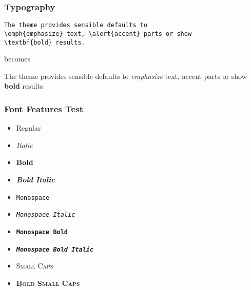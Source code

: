 \documentclass[10pt]{beamer}
\begin{document}
\begin{frame}[fragile]
\frametitle{Typography}
  \begin{verbatim}The theme provides sensible defaults to
\emph{emphasize} text, \alert{accent} parts or show
\textbf{bold} results.\end{verbatim}
  \begin{center}
    becomes
  \end{center}
  The theme provides sensible defaults to \emph{emphasize} text,
  \alert{accent} parts or show \textbf{bold} results.
\end{frame}

\begin{frame}
\frametitle{Font Features Test}
  \begin{itemize}
    \item Regular
    \item \textit{Italic}
    \item \textbf{Bold}
    \item \textbf{\textit{Bold Italic}}
    \item \texttt{Monospace}
    \item \texttt{\textit{Monospace Italic}}
    \item \texttt{\textbf{Monospace Bold}}
    \item \texttt{\textbf{\textit{Monospace Bold Italic}}}
    \item \textsc{Small Caps}
    \item \textbf{\textsc{Bold Small Caps}}
  \end{itemize}
\end{frame}
\end{document}

